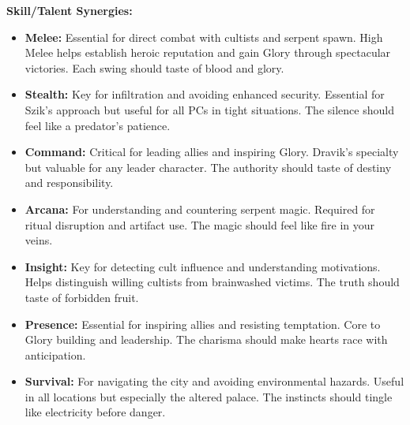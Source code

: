 \documentclass[11pt]{article}
\begin{document}
\textbf{Skill/Talent Synergies:}
\begin{itemize}
\item \textbf{Melee:} Essential for direct combat with cultists and serpent spawn. High Melee helps establish heroic reputation and gain Glory through spectacular victories. Each swing should taste of blood and glory.
\item \textbf{Stealth:} Key for infiltration and avoiding enhanced security. Essential for Szik's approach but useful for all PCs in tight situations. The silence should feel like a predator's patience.
\item \textbf{Command:} Critical for leading allies and inspiring Glory. Dravik's specialty but valuable for any leader character. The authority should taste of destiny and responsibility.
\item \textbf{Arcana:} For understanding and countering serpent magic. Required for ritual disruption and artifact use. The magic should feel like fire in your veins.
\item \textbf{Insight:} Key for detecting cult influence and understanding motivations. Helps distinguish willing cultists from brainwashed victims. The truth should taste of forbidden fruit.
\item \textbf{Presence:} Essential for inspiring allies and resisting temptation. Core to Glory building and leadership. The charisma should make hearts race with anticipation.
\item \textbf{Survival:} For navigating the city and avoiding environmental hazards. Useful in all locations but especially the altered palace. The instincts should tingle like electricity before danger.
\end{itemize}
\end{document}
